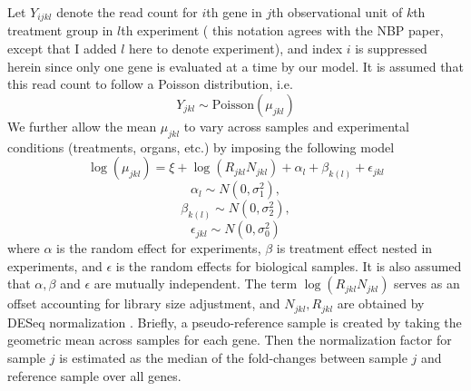 \documentclass[11pt, a4paper]{article}
\begin{document}
Let $Y_{ijkl}$ denote the read count for $i$th gene in $j$th observational unit of $k$th treatment group in $l$th experiment ( {\color{red} this notation agrees with the NBP paper, except that I added $l$ here to denote experiment}), and index $i$ is suppressed herein since only one gene is evaluated at a time by our model. It is assumed that this read count to follow a Poisson distribution, i.e.  
  \[Y_{jkl}\sim \text{Poisson}(\mu_{jkl})\]
  We further allow the mean $\mu_{jkl}$ to vary across samples and experimental conditions (treatments, organs, etc.) by imposing the following model 
  \begin{equation}\label{q1}
   \log( \mu_{jkl}) = \xi + \log(R_{jkl}N_{jkl})+ \alpha_l + \beta_{k(l)} + \epsilon_{jkl} 
  \end{equation}
  \[\alpha_l\sim N(0, \sigma^2_1),\] 
  \[\beta_{k(l)}\sim N(0, \sigma^2_2),\]
   \[\epsilon_{jkl}\sim N(0, \sigma_0^2)\]
  where $\alpha$  is the random effect for experiments,  $\beta$ is treatment effect nested in experiments, and $\epsilon$ is the random effects for biological samples. It is also assumed that $\alpha, \beta$ and $\epsilon$ are mutually independent. The term $\log(R_{jkl}N_{jkl})$ serves as an offset accounting for library size adjustment, and $N_{jkl}, R_{jkl}$ are obtained by DESeq normalization \citep{anders2010differential}. Briefly, a pseudo-reference sample is created by taking the geometric mean across samples for each gene. Then the normalization factor for sample $j$ is estimated as the median of the fold-changes between sample $j$ and reference sample over all genes. \\
  
\end{document}
